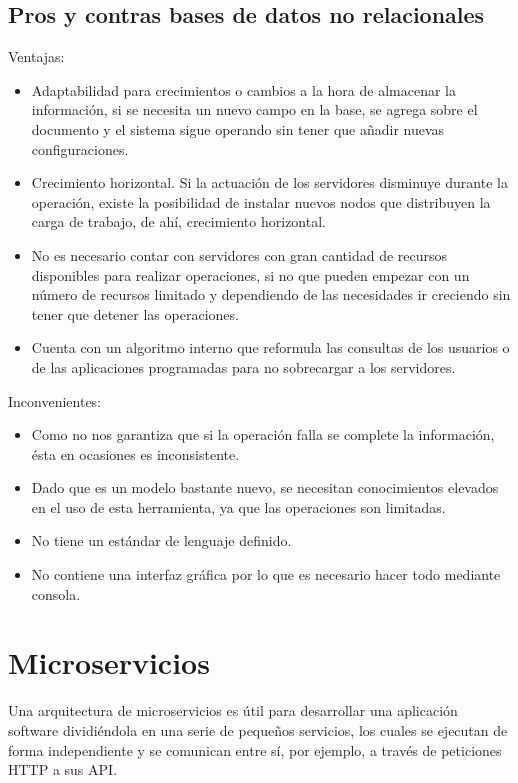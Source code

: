 \documentclass[12pt]{report} %
\begin{document}
	\subsection{Pros y contras bases de datos no relacionales}
		Ventajas:
	\begin{itemize}
		\item Adaptabilidad para crecimientos o cambios a la hora de almacenar la información, si se necesita un nuevo campo en la base, se agrega sobre el documento y el sistema sigue operando sin tener que añadir nuevas configuraciones.
		\item Crecimiento horizontal. Si la actuación de los servidores disminuye durante la operación, existe la posibilidad de instalar nuevos nodos que distribuyen la carga de trabajo, de ahí, crecimiento horizontal.
		\item No es necesario contar con servidores con gran cantidad de recursos disponibles para realizar operaciones, si no que pueden empezar con un número de recursos limitado y dependiendo de las necesidades ir creciendo sin tener que detener las operaciones.
		\item Cuenta con un algoritmo interno que reformula las consultas de los usuarios o de las aplicaciones programadas para no sobrecargar a los servidores.
	\end{itemize}
	Inconvenientes:
	\begin{itemize}
		\item Como no nos garantiza que si la operación falla se complete la información, ésta en ocasiones es inconsistente.
		\item Dado que es un modelo bastante nuevo, se necesitan conocimientos elevados en el uso de esta herramienta, ya que las operaciones son limitadas.
		\item No tiene un estándar de lenguaje definido.
		\item No contiene una interfaz gráfica por lo que es necesario hacer todo mediante consola.
	\end{itemize}

\section{Microservicios}

Una arquitectura de microservicios es útil para desarrollar una aplicación software dividiéndola en una serie de pequeños servicios, los cuales se ejecutan de forma independiente y se comunican entre sí, por ejemplo, a través de peticiones HTTP a sus API.
\end{document}
